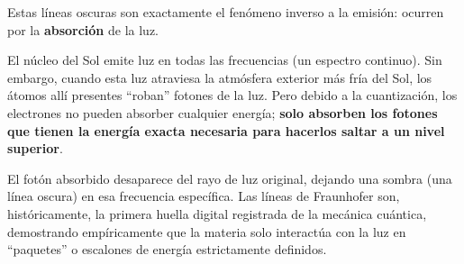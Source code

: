 \documentclass[11pt,a4paper]{book}
\begin{document}
Estas líneas oscuras son exactamente el fenómeno inverso a la emisión: ocurren por la \textbf{absorción} de la luz. 

El núcleo del Sol emite luz en todas las frecuencias (un espectro continuo). Sin embargo, cuando esta luz atraviesa la atmósfera exterior más fría del Sol, los átomos allí presentes ``roban'' fotones de la luz. Pero debido a la cuantización, los electrones no pueden absorber cualquier energía; \textbf{solo absorben los fotones que tienen la energía exacta necesaria para hacerlos saltar a un nivel superior}. 

El fotón absorbido desaparece del rayo de luz original, dejando una sombra (una línea oscura) en esa frecuencia específica. Las líneas de Fraunhofer son, históricamente, la primera huella digital registrada de la mecánica cuántica, demostrando empíricamente que la materia solo interactúa con la luz en ``paquetes'' o escalones de energía estrictamente definidos.

\end{document}

